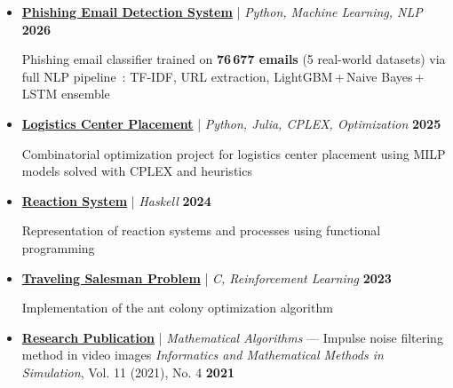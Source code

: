\documentclass[10pt,english,french]{article}
\begin{document}
\vspace{-4pt}
\begin{itemize}[leftmargin=0.5cm, label=\textbullet, itemsep=0.2em]
    \item \href{https://github.com/DmytroPalahin/phishing-email-detection}{\textbf{Phishing Email Detection System}} | \textit{Python, Machine Learning, NLP} \hfill \textbf{2026}

          Phishing email classifier trained on \textbf{76\,677 emails} (5 real-world datasets) via
          full NLP pipeline~: TF-IDF, URL extraction, LightGBM\,+\,Naive Bayes\,+\,LSTM ensemble

    \item \href{https://github.com/DmytroPalahin/logistics-center-placement}{\textbf{Logistics Center Placement}} | \textit{Python, Julia, CPLEX, Optimization} \hfill \textbf{2025}

          Combinatorial optimization project for logistics center placement using MILP
          models solved with CPLEX and heuristics

    \item \href{https://github.com/DmytroPalahin/hsReact}{\textbf{Reaction System}} | \textit{Haskell} \hfill \textbf{2024}

          Representation of reaction systems and processes using functional programming

    \item \href{https://github.com/DmytroPalahin/Probleme_du_Voyageur_de_Commerce}{\textbf{Traveling Salesman Problem}} | \textit{C, Reinforcement Learning} \hfill \textbf{2023}

          Implementation of the ant colony optimization algorithm

    \item \href{https://www.researchsquare.com/article/rs-2203260/v1}{\textbf{Research Publication}} | \textit{Mathematical Algorithms} --- Impulse noise filtering method in video images \textit{Informatics and Mathematical Methods in Simulation}, Vol. 11 (2021), No. 4 \hfill \textbf{2021}


\end{itemize}
\end{document}
